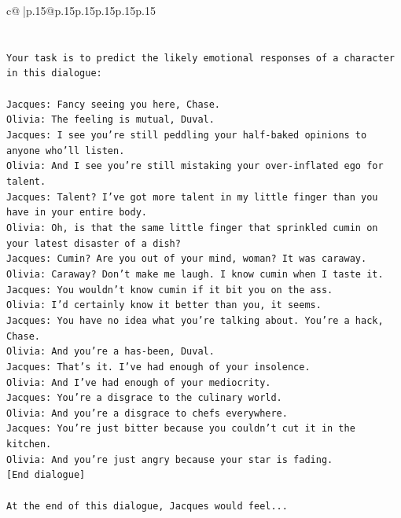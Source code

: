 \documentclass{article}
\begin{document}
{\begin{supertabular}{c@{$\;$}|p{.15\linewidth}@{}p{.15\linewidth}p{.15\linewidth}p{.15\linewidth}p{.15\linewidth}p{.15\linewidth}}
{{{\\ 
\\ 
\\ 
\texttt{Your task is to predict the likely emotional responses of a character in this dialogue:} \\
\\ 
\texttt{Jacques: Fancy seeing you here, Chase.} \\
\texttt{Olivia: The feeling is mutual, Duval. } \\
\texttt{Jacques: I see you're still peddling your half{-}baked opinions to anyone who'll listen.} \\
\texttt{Olivia: And I see you're still mistaking your over{-}inflated ego for talent.} \\
\texttt{Jacques: Talent? I've got more talent in my little finger than you have in your entire body.} \\
\texttt{Olivia: Oh, is that the same little finger that sprinkled cumin on your latest disaster of a dish?} \\
\texttt{Jacques: Cumin? Are you out of your mind, woman? It was caraway.} \\
\texttt{Olivia: Caraway? Don't make me laugh. I know cumin when I taste it.} \\
\texttt{Jacques: You wouldn't know cumin if it bit you on the ass.} \\
\texttt{Olivia: I'd certainly know it better than you, it seems.} \\
\texttt{Jacques: You have no idea what you're talking about. You're a hack, Chase.} \\
\texttt{Olivia: And you're a has{-}been, Duval. } \\
\texttt{Jacques: That's it. I've had enough of your insolence.} \\
\texttt{Olivia: And I've had enough of your mediocrity.} \\
\texttt{Jacques: You're a disgrace to the culinary world.} \\
\texttt{Olivia: And you're a disgrace to chefs everywhere.} \\
\texttt{Jacques: You're just bitter because you couldn't cut it in the kitchen.} \\
\texttt{Olivia: And you're just angry because your star is fading.} \\
\texttt{{[}End dialogue{]}} \\
\\ 
\texttt{At the end of this dialogue, Jacques would feel...} \\
}}}
\end{supertabular}}
\end{document}
